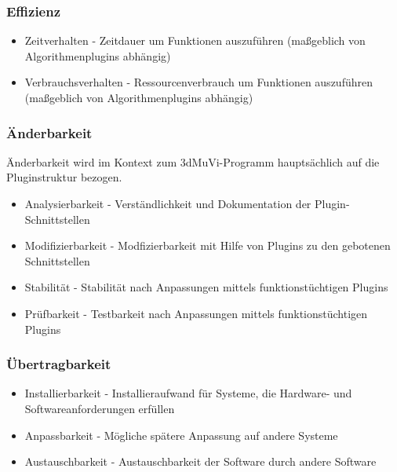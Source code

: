 \subsubsection{Effizienz}
\begin{itemize}
\item Zeitverhalten - Zeitdauer um Funktionen auszuführen (maßgeblich von Algorithmenplugins abhängig)
\item Verbrauchsverhalten - Ressourcenverbrauch um Funktionen auszuführen (maßgeblich von Algorithmenplugins abhängig)
\end{itemize}
\subsubsection{Änderbarkeit} 
Änderbarkeit wird im Kontext zum 3dMuVi-Programm hauptsächlich auf die Pluginstruktur bezogen.
\begin{itemize}
\item Analysierbarkeit - Verständlichkeit und Dokumentation der Plugin-Schnittstellen
\item Modifizierbarkeit - Modfizierbarkeit mit Hilfe von Plugins zu den gebotenen Schnittstellen
\item Stabilität - Stabilität nach Anpassungen mittels funktionstüchtigen Plugins 
\item Prüfbarkeit - Testbarkeit nach Anpassungen mittels funktionstüchtigen Plugins 
\end{itemize}
\subsubsection{Übertragbarkeit}
\begin{itemize}
\item Installierbarkeit - Installieraufwand für Systeme, die Hardware- und Softwareanforderungen erfüllen
\item Anpassbarkeit - Mögliche spätere Anpassung auf andere Systeme   
\item Austauschbarkeit - Austauschbarkeit der Software durch andere Software 
\end{itemize}


